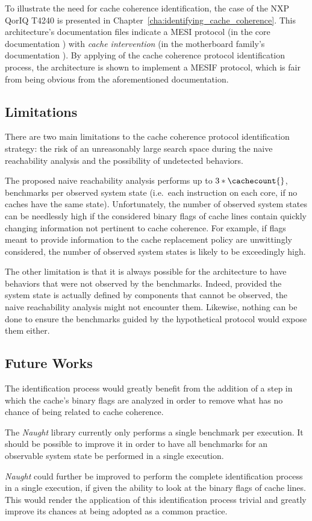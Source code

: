 To illustrate the need for cache coherence identification, the case of the NXP
QorIQ T4240 is presented in Chapter~\ref{cha:identifying_cache_coherence}.
This architecture's documentation files indicate a MESI protocol (in the core
documentation \cite{e6500}) with \textit{cache intervention} (in the
motherboard family's documentation \cite{T4240}). By applying of the cache
coherence protocol identification process, the architecture is shown to
implement a MESIF protocol, which is fair from being obvious from the
aforementioned documentation.

\subsection{Limitations}
There are two main limitations to the cache coherence protocol identification
strategy: the risk of an unreasonably large search space during the naive
reachability analysis and the possibility of undetected
behaviors.

The proposed naive reachability analysis performs up to $3 * \cachecount{}$,
benchmarks per observed system state (i.e.~each instruction on each core, if no
caches have the same state). Unfortunately, the number of observed system states
can be needlessly high if the considered binary flags of cache lines contain
quickly changing information not pertinent to cache coherence. For example, if
flags meant to provide information to the cache replacement policy are
unwittingly considered, the number of observed system states is likely to be
exceedingly high.

The other limitation is that it is always possible for the architecture to have
behaviors that were not observed by the benchmarks. Indeed, provided the system
state is actually defined by components that cannot be observed, the naive
reachability analysis might not encounter them. Likewise, nothing can be done
to ensure the benchmarks guided by the hypothetical protocol would expose them
either.

\subsection{Future Works}
The identification process would greatly benefit from the addition of a step
in which the cache's binary flags are analyzed in order to remove what has no
chance of being related to cache coherence.

The \textit{Naught} library currently only performs a single benchmark per
execution. It should be possible to improve it in order to have all benchmarks
for an observable system state be performed in a single execution.

\textit{Naught} could further be improved to perform the complete
identification process in a single execution, if given the ability to look at
the binary flags of cache lines. This would render the application of this
identification process trivial and greatly improve its chances at being adopted
as a common practice.
